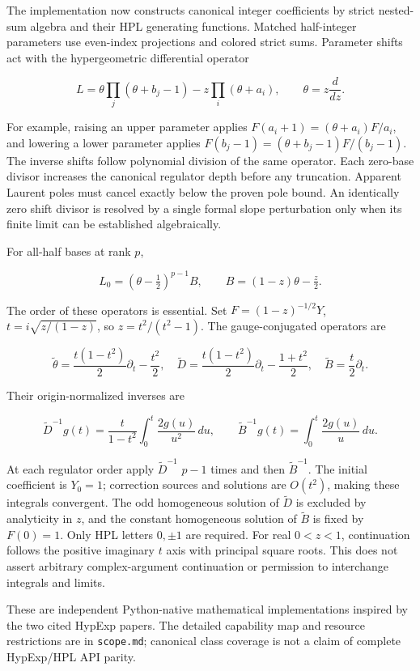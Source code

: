 \documentclass[
  11pt,
]{article}
\begin{document}
The implementation now constructs canonical integer coefficients by
strict nested-sum algebra and their HPL generating functions. Matched
half-integer parameters use even-index projections and colored strict
sums. Parameter shifts act with the hypergeometric differential operator

\[
 L=\theta\prod_j(\theta+b_j-1)-z\prod_i(\theta+a_i),
 \qquad \theta=z\frac{d}{dz}.
\]

For example, raising an upper parameter applies
\(F(a_i+1)=(\theta+a_i)F/a_i\), and lowering a lower parameter applies
\(F(b_j-1)=(\theta+b_j-1)F/(b_j-1)\). The inverse shifts follow
polynomial division of the same operator. Each zero-base divisor
increases the canonical regulator depth before any truncation. Apparent
Laurent poles must cancel exactly below the proven pole bound. An
identically zero shift divisor is resolved by a single formal slope
perturbation only when its finite limit can be established
algebraically.

For all-half bases at rank \(p\),

\[
 L_0=(\theta-\tfrac12)^{p-1}B,
 \qquad B=(1-z)\theta-\tfrac z2.
\]

The order of these operators is essential. Set \(F=(1-z)^{-1/2}Y\),
\(t=i\sqrt{z/(1-z)}\), so \(z=t^2/(t^2-1)\). The gauge-conjugated
operators are

\[
 \widetilde\theta=\frac{t(1-t^2)}2\partial_t-\frac{t^2}2,
 \quad \widetilde D=\frac{t(1-t^2)}2\partial_t-\frac{1+t^2}2,
 \quad \widetilde B=\frac t2\partial_t.
\]

Their origin-normalized inverses are

\[
 \widetilde D^{-1}g(t)=\frac{t}{1-t^2}\int_0^t\frac{2g(u)}{u^2}\,du,
 \qquad
 \widetilde B^{-1}g(t)=\int_0^t\frac{2g(u)}u\,du.
\]

At each regulator order apply \(\widetilde D^{-1}\) \(p-1\) times and
then \(\widetilde B^{-1}\). The initial coefficient is \(Y_0=1\);
correction sources and solutions are \(O(t^2)\), making these integrals
convergent. The odd homogeneous solution of \(\widetilde D\) is excluded
by analyticity in \(z\), and the constant homogeneous solution of
\(\widetilde B\) is fixed by \(F(0)=1\). Only HPL letters \(0,\pm1\) are
required. For real \(0<z<1\), continuation follows the positive
imaginary \(t\) axis with principal square roots. This does not assert
arbitrary complex-argument continuation or permission to interchange
integrals and limits.

These are independent Python-native mathematical implementations
inspired by the two cited HypExp papers. The detailed capability map and
resource restrictions are in \texttt{scope.md}; canonical class coverage
is not a claim of complete HypExp/HPL API parity.
\end{document}
